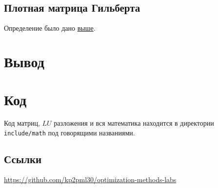 \documentclass[russian, english]{article}
\begin{document}
\subsection{Плотная матрица Гильберта}
Определение было дано \hyperref[Gilbert]{выше}.\\

\section{Вывод}

\newpage
\appendix
\section{Код}
Код матриц, $LU$ разложения и вся математика находится в директории \texttt{include/math} под говорящими названиями.
\subsection{Ссылки}
\url{https://github.com/kp2pml30/optimization-methods-labs}
\end{document}
